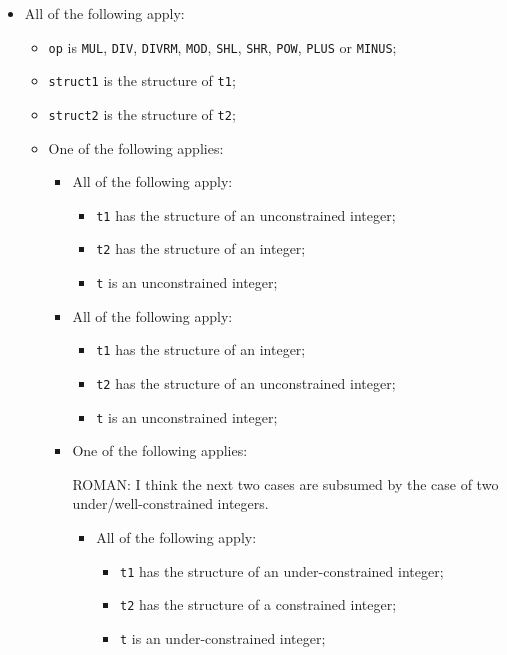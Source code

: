 \documentclass{book}
\begin{document}
\begin{itemize}
  \item All of the following apply:
    \begin{itemize}
    \item \texttt{op} is \texttt{MUL}, \texttt{DIV}, \texttt{DIVRM}, \texttt{MOD}, \texttt{SHL}, \texttt{SHR}, \texttt{POW}, \texttt{PLUS} or \texttt{MINUS};
    \item \texttt{struct1} is the structure of \texttt{t1};
    \item \texttt{struct2} is the structure of \texttt{t2};
    \item One of the following applies:
      \begin{itemize}
      \item All of the following apply:
        \begin{itemize}
        \item \texttt{t1} has the structure of an unconstrained integer;
        \item \texttt{t2} has the structure of an integer;
        \item \texttt{t} is an unconstrained integer;
        \end{itemize}
      \item All of the following apply:
        \begin{itemize}
        \item \texttt{t1} has the structure of an integer;
        \item \texttt{t2} has the structure of an unconstrained integer;
        \item \texttt{t} is an unconstrained integer;
        \end{itemize}
      \item One of the following applies: 
\begin{emptytodo}    
ROMAN: I think the next two cases are subsumed by the case of two under/well-constrained integers.
\end{emptytodo}
       \begin{itemize} 
       \item All of the following apply:
          \begin{itemize}
          \item \texttt{t1} has the structure of an under-constrained integer;
          \item \texttt{t2} has the structure of a constrained integer;
          \item \texttt{t} is an under-constrained integer;
          \end{itemize}

\end{itemize}
\end{itemize}
\end{itemize}
\end{itemize}
\end{document}

